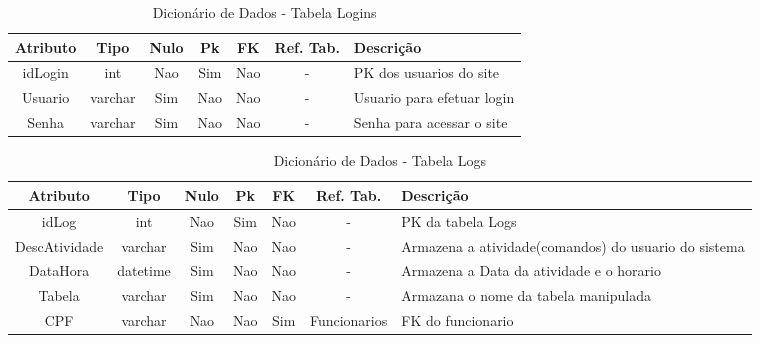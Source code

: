 \documentclass[
	12pt,				%
	openright,			%
	oneside,			%
	a4paper,			%
	chapter=TITLE,		%
	section=TITLE,		%
	english,			%
	brazil				%
	]{abntex2}
\begin{document}
    \begin{table}[htbp]
    \centering
        \caption{Dicionário de Dados - Tabela Logins}
        \label{tb1_dicionario_dados_logins}
        \begin{tabular}{|c|c|c|c|c|c|p{3cm}|}
            \hline
            \textbf{Atributo} & 
            \textbf{Tipo} & 
            \textbf{Nulo} & 
            \textbf{Pk} & 
            \textbf{FK} & 
            \textbf{Ref. Tab.} & 
            \textbf{Descrição} \\ \hline
            idLogin & int & Nao & Sim & Nao & - & PK dos usuarios do site \\ \hline
            Usuario & varchar & Sim & Nao & Nao & - & Usuario para efetuar login \\ \hline
            Senha & varchar & Sim & Nao & Nao & - & Senha para acessar o site \\ \hline
        \end{tabular}
    \end{table}
    
    \begin{table}[htbp]
    \centering
        \caption{Dicionário de Dados - Tabela Logs}
        \label{tb1_dicionario_dados_logs}
        \begin{tabular}{|c|c|c|c|c|c|p{3cm}|}
            \hline
            \textbf{Atributo} & 
            \textbf{Tipo} & 
            \textbf{Nulo} & 
            \textbf{Pk} & 
            \textbf{FK} & 
            \textbf{Ref. Tab.} & 
            \textbf{Descrição} \\ \hline
            idLog & int & Nao & Sim & Nao & - & PK da tabela Logs \\ \hline
            DescAtividade & varchar & Sim & Nao & Nao & - & Armazena a atividade(comandos) do usuario do sistema \\ \hline
            DataHora & datetime & Sim & Nao & Nao & - & Armazena a Data da atividade e o horario \\ \hline
            Tabela & varchar & Sim & Nao & Nao & - & Armazana o nome da tabela manipulada \\ \hline
            CPF & varchar & Nao & Nao & Sim & Funcionarios & FK do funcionario \\ \hline
        \end{tabular}
    \end{table}
    
\end{document}
